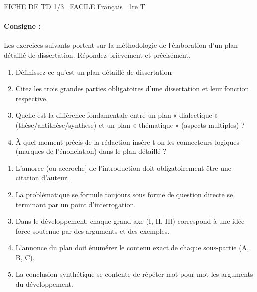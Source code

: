 \documentclass[11pt]{article}
\begin{document}
\begin{tcolorbox}[enhanced,colback=popink,colframe=popink,arc=10pt,boxrule=0pt,left=12pt,right=12pt,top=9pt,bottom=9pt]
{\color{white}\popxbold\small FICHE DE TD 1/3 \textbullet\ FACILE \hfill Français \textbullet\ 1re T\par}
\end{tcolorbox}
\vspace{4pt}
\paragraph{Consigne :} Les exercices suivants portent sur la méthodologie de l'élaboration d'un plan détaillé de dissertation. Répondez brièvement et précisément.

\begin{exercice}
\begin{enumerate}
    \item Définissez ce qu'est un plan détaillé de dissertation.
    \item Citez les trois grandes parties obligatoires d'une dissertation et leur fonction respective.
    \item Quelle est la différence fondamentale entre un plan « dialectique » (thèse/antithèse/synthèse) et un plan « thématique » (aspects multiples) ?
    \item À quel moment précis de la rédaction insère-t-on les connecteurs logiques (marques de l'énonciation) dans le plan détaillé ?
\end{enumerate}
\end{exercice}

\begin{exercice}
\begin{enumerate}
    \item L'amorce (ou accroche) de l'introduction doit obligatoirement être une citation d'auteur.
    \item La problématique se formule toujours sous forme de question directe se terminant par un point d'interrogation.
    \item Dans le développement, chaque grand axe (I, II, III) correspond à une idée-force soutenue par des arguments et des exemples.
    \item L'annonce du plan doit énumérer le contenu exact de chaque sous-partie (A, B, C).
    \item La conclusion synthétique se contente de répéter mot pour mot les arguments du développement.
\end{enumerate}
\end{exercice}
\end{document}
